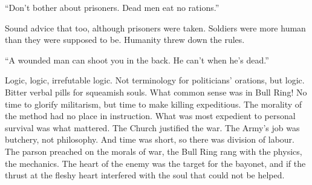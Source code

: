 ``Don't bother about prisoners. Dead men eat no rations.''

Sound advice that too, although prisoners were taken. Soldiers were more human 
than they were supposed to be. Humanity threw down the rules.

``A wounded man can shoot you in the back. He can't when he's dead.''

Logic, logic, irrefutable logic. Not terminology for politicians' orations, 
but logic. Bitter verbal pills for squeamish souls. What common sense was in 
Bull Ring! No time to glorify militarism, but time to make killing 
expeditious. The morality of the method had no place in instruction. 
What was most expedient to personal survival was what mattered. The 
Church justified the war. The Army's job was butchery, not philosophy. 
And time was short, so there was division of labour. The parson preached 
on the morals of war, the Bull Ring rang with the physics, the mechanics. 
The heart of the enemy was the target for the bayonet, and if the thrust 
at the fleshy heart interfered with the soul that could not be helped.